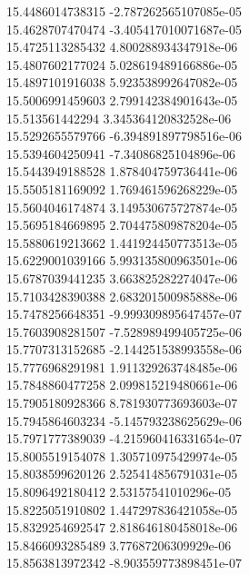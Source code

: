 {15.4486014738315 -2.787262565107085e-05
 \\
15.4628707470474 -3.405417010071687e-05
 \\
15.4725113285432 4.800288934347918e-06
 \\
15.4807602177024 5.028619489166886e-05
 \\
15.4897101916038 5.923538992647082e-05
 \\
15.5006991459603 2.799142384901643e-05
 \\
15.513561442294 3.345364120832528e-06
 \\
15.5292655579766 -6.394891897798516e-06
 \\
15.5394604250941 -7.34086825104896e-06
 \\
15.5443949188528 1.878404759736441e-06
 \\
15.5505181169092 1.769461596268229e-05
 \\
15.5604046174874 3.149530675727874e-05
 \\
15.5695184669895 2.704475809878204e-05
 \\
15.5880619213662 1.441924450773513e-05
 \\
15.6229001039166 5.993135800963501e-06
 \\
15.6787039441235 3.663825282274047e-06
 \\
15.7103428390388 2.683201500985888e-06
 \\
15.7478256648351 -9.999309895647457e-07
 \\
15.7603908281507 -7.528989499405725e-06
 \\
15.7707313152685 -2.144251538993558e-06
 \\
15.7776968291981 1.911329263748485e-06
 \\
15.7848860477258 2.099815219480661e-06
 \\
15.7905180928366 8.781930773693603e-07
 \\
15.7945864603234 -5.145793238625629e-06
 \\
15.7971777389039 -4.215960416331654e-07
 \\
15.8005519154078 1.305710975429974e-05
 \\
15.8038599620126 2.525414856791031e-05
 \\
15.8096492180412 2.53157541010296e-05
 \\
15.8225051910802 1.447297836421058e-05
 \\
15.8329254692547 2.818646180458018e-06
 \\
15.8466093285489 3.77687206309929e-06
 \\
15.8563813972342 -8.903559773898451e-07
}
